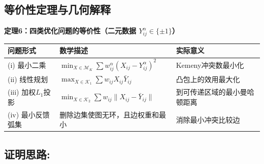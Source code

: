 \documentclass[a4paper]{article}
\begin{document}
\subsection{等价性定理与几何解释}

\textbf{定理6：四类优化问题的等价性（二元数据 $Y_{ij}^\alpha \in \{\pm1\}$）}

\begin{table}[h]
    \centering
    \begin{tabular}{m{3cm} m{7cm} m{5cm}}
        \textbf{问题形式} & \textbf{数学描述} & \textbf{实际意义} \\
        \hline
        (i) 最小二乘 & $\min_{X \in \mathcal{M}_K} \sum w_{ij}^\alpha (X_{ij} - Y_{ij}^\alpha)^2$ & Kemeny冲突数最小化 \\
        \hline
        (ii) 线性规划 & $\max_{X \in \mathcal{K}_1} \sum w_{ij} X_{ij} \bar{Y}_{ij}$ & 凸包上的效用最大化 \\
        \hline
        (iii) 加权$L_1$投影 & $\min_{X \in \mathcal{K}_2} \sum w_{ij} \|X_{ij} - \bar{Y}_{ij}\|$ & 到可传递区域的最小曼哈顿距离 \\
        \hline
        (iv) 最小反馈弧集 & 删除边集使图无环，且边权重和最小 & 消除最小冲突比较边 \\
    \end{tabular}
\end{table}

\subsection*{证明思路:}
\end{document}
